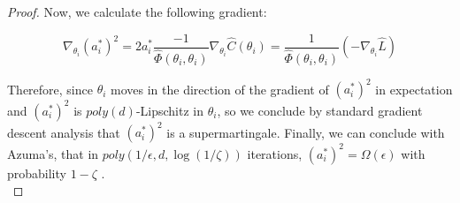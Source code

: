 \documentclass[11pt]{article}
\begin{document}
\begin{proof}
Now, we calculate the following gradient: 

\begin{equation}
\nabla_{\theta_i} (a_i^*)^2 = 2a_i^*\frac{-1}{\widehat{\Phi}(\theta_i,\theta_i)} \nabla_{\theta_i} \widehat{C}(\theta_i) = \frac{1}{\widehat{\Phi}(\theta_i,\theta_i)} (-\nabla_{\theta_i} \widehat{L})
\end{equation}

Therefore, since $\theta_i$ moves in the direction of the gradient of $(a_i^*)^2$ in expectation and $(a_i^*)^2$ is $poly(d)$-Lipschitz in $\theta_i$, so we conclude by standard gradient descent analysis that $(a_i^*)^2$ is a supermartingale. Finally, we can conclude with Azuma's, that in $poly(1/\epsilon,d,\log(1/\zeta))$ iterations, $(a_i^*)^2 = \Omega(\epsilon)$ with probability $1-\zeta$ .\\


\end{proof}


\eigConv*
\end{document}

